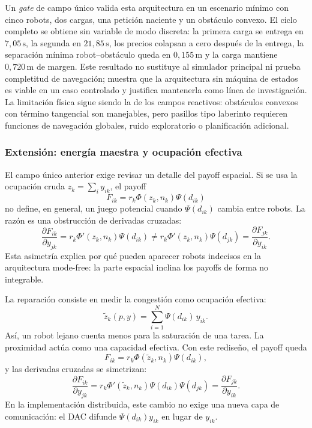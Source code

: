 Un \emph{gate} de campo único valida esta arquitectura en un
escenario mínimo con cinco robots, dos cargas, una petición naciente y un obstáculo
convexo. El ciclo completo se obtiene sin variable de modo discreta: la primera carga se
entrega en $7{,}05\,\text{s}$, la segunda en $21{,}85\,\text{s}$, los precios colapsan a
cero después de la entrega, la separación mínima robot--obstáculo queda en
$0{,}155\,\text{m}$ y la carga mantiene $0{,}720\,\text{m}$ de margen. Este resultado no
sustituye al simulador principal ni prueba completitud de navegación; muestra que la
arquitectura sin máquina de estados es viable en un caso controlado y justifica
mantenerla como línea de investigación. La limitación física sigue siendo la de los
campos reactivos: obstáculos convexos con término tangencial son manejables, pero
pasillos tipo laberinto requieren funciones de navegación globales, ruido exploratorio o
planificación adicional.

\subsubsection{Extensión: energía maestra y ocupación efectiva}
\label{subsubsec:energia_maestra}

El campo único anterior exige revisar un detalle del payoff espacial. Si se usa la
ocupación cruda $z_k=\sum_i y_{ik}$, el payoff
\[
  F_{ik}=r_k\Phi(z_k,n_k)\Psi(d_{ik})
\]
no define, en general, un juego potencial cuando $\Psi(d_{ik})$ cambia entre robots. La
razón es una obstrucción de derivadas cruzadas:
\[
  \frac{\partial F_{ik}}{\partial y_{jk}}
  = r_k\Phi'(z_k,n_k)\Psi(d_{ik})
  \neq
  r_k\Phi'(z_k,n_k)\Psi(d_{jk})
  =
  \frac{\partial F_{jk}}{\partial y_{ik}} .
  \label{eq:obstruccion_psi}
\]
Esta asimetría explica por qué pueden aparecer robots indecisos en la arquitectura
mode-free: la parte espacial inclina los payoffs de forma no integrable.

La reparación consiste en medir la congestión como ocupación efectiva:
\begin{equation}
  \tilde z_k(p,y)=\sum_{i=1}^{N}\Psi(d_{ik})\,y_{ik}.
  \label{eq:ocupacion_efectiva}
\end{equation}
Así, un robot lejano cuenta menos para la saturación de una tarea. La proximidad actúa
como una capacidad efectiva. Con este rediseño, el payoff queda
\begin{equation}
  F_{ik}=r_k\Phi(\tilde z_k,n_k)\Psi(d_{ik}),
  \label{eq:payoff_efectivo}
\end{equation}
y las derivadas cruzadas se simetrizan:
\[
  \frac{\partial F_{ik}}{\partial y_{jk}}
  =
  r_k\Phi'(\tilde z_k,n_k)\Psi(d_{ik})\Psi(d_{jk})
  =
  \frac{\partial F_{jk}}{\partial y_{ik}} .
\]
En la implementación distribuida, este cambio no exige una nueva capa de comunicación:
el DAC difunde $\Psi(d_{ik})y_{ik}$ en lugar de $y_{ik}$.

